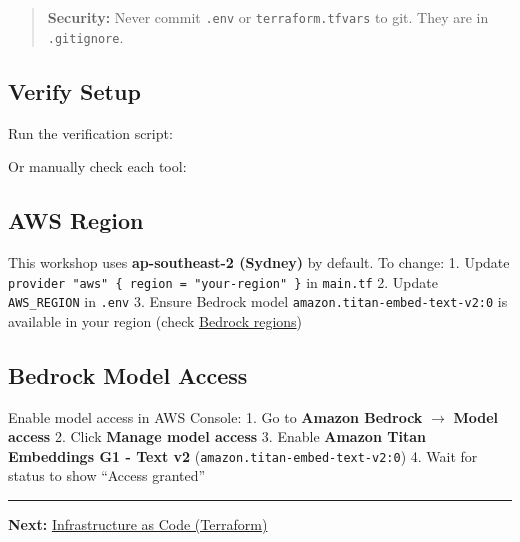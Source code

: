 \begin{quote}
\textbf{Security:} Never commit \texttt{.env} or
\texttt{terraform.tfvars} to git. They are in \texttt{.gitignore}.
\end{quote}

\hypertarget{verify-setup}{%
\subsection{Verify Setup}}

Run the verification script:

\begin{Shaded}
\begin{Highlighting}[]
\end{Highlighting}
\end{Shaded}

Or manually check each tool:

\begin{Shaded}
\begin{Highlighting}[]
  
\end{Highlighting}
\end{Shaded}

\hypertarget{aws-region}{%
\subsection{AWS Region}}

This workshop uses \textbf{ap-southeast-2 (Sydney)} by default. To
change: 1. Update
\texttt{provider\ "aws"\ \{\ region\ =\ "your-region"\ \}} in
\texttt{main.tf} 2. Update \texttt{AWS\_REGION} in \texttt{.env} 3.
Ensure Bedrock model \texttt{amazon.titan-embed-text-v2:0} is available
in your region (check
\href{https://docs.aws.amazon.com/bedrock/latest/userguide/models-regions.html}{Bedrock
regions})

\hypertarget{bedrock-model-access}{%
\subsection{Bedrock Model Access}}

Enable model access in AWS Console: 1. Go to \textbf{Amazon Bedrock}
\(\rightarrow\) \textbf{Model access} 2. Click \textbf{Manage model
access} 3. Enable \textbf{Amazon Titan Embeddings G1 - Text v2}
(\texttt{amazon.titan-embed-text-v2:0}) 4. Wait for status to show
``Access granted''

\begin{center}\rule{0.5\linewidth}{0.5pt}\end{center}

\textbf{Next:} \href{5.3-Infrastructure/}{Infrastructure as Code
(Terraform)}
